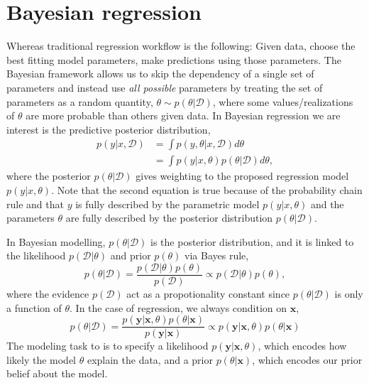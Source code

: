 \section{Bayesian regression}
Whereas traditional regression workflow is the following: Given data, choose the best fitting model
parameters, make predictions using those parameters. The Bayesian framework allows us to skip the
dependency of a single set of parameters and instead use \textit{all possible} parameters by treating the set
of parameters as a random quantity, $\theta \sim p(\theta|\mathcal{D})$, where some values/realizations of $\theta$ are more
probable than others given data. In Bayesian regression we are interest is the predictive posterior distribution,  
\begin{align}\label{Predictive2}
    p(y|x, \mathcal{D}) &= \int p(y,\theta|x, \mathcal{D}) d\theta\\
    &= \int p(y|x,\theta)p(\theta|\mathcal{D}) d\theta,
\end{align}
where the posterior $p(\theta|\mathcal{D})$ gives weighting to the proposed regression model
$p(y|x,\theta)$. Note that the second equation is true because of the probability chain rule and
that $y$ is fully described by the parametric model $p(y|x,\theta)$ and the parameters $\theta$ are
fully described by the posterior distribution $p(\theta|\mathcal{D})$.
\begin{testexample2}
    In Bayesian modelling, $p(\theta|\mathcal{D})$ is the posterior distribution, and it is linked
     to the likelihood $p(\mathcal{D}|\theta)$ and prior $p(\theta)$ via Bayes rule,
    $$p(\theta|\mathcal{D}) = \frac{p(\mathcal{D}|\theta)p(\theta)}{p(\mathcal{D})} \propto
    p(\mathcal{D}|\theta)p(\theta),$$ where the evidence $p(\mathcal{D})$ act as a propotionality
    constant since $p(\theta|\mathcal{D})$ is only a function of $\theta$. In the case of
    regression, we always condition on $\textbf{x}$, 
    $$p(\theta| \mathcal{D}) = \frac{p(\textbf{y}|\textbf{x}, \theta)p(\theta|
    \textbf{x})}{p(\textbf{y}|\textbf{x})} \propto p(\textbf{y}|\textbf{x}, \theta)p(\theta| \textbf{x})$$
    The modeling task to is to specify a likelihood $p(\textbf{y}|\textbf{x},\theta)$, which encodes how likely the model $\theta$
    explain the data, and a prior $p(\theta|\textbf{x})$, which encodes our prior belief about the model. 
\end{testexample2}

